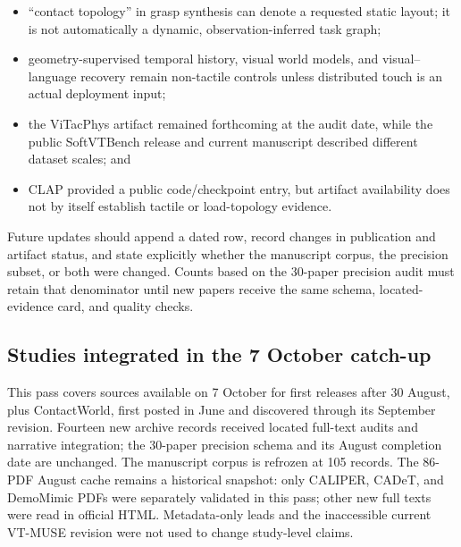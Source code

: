 \begin{itemize}
  \item ``contact topology'' in grasp synthesis can denote a requested static
  layout; it is not automatically a dynamic, observation-inferred task graph;
  \item geometry-supervised temporal history, visual world models, and visual--
  language recovery remain non-tactile controls unless distributed touch is an
  actual deployment input;
  \item the ViTacPhys artifact remained forthcoming at the audit date, while the
  public SoftVTBench release and current manuscript described different dataset
  scales; and
  \item CLAP provided a public code/checkpoint entry, but artifact availability
  does not by itself establish tactile or load-topology evidence.
\end{itemize}

Future updates should append a dated row, record changes in publication and
artifact status, and state explicitly whether the manuscript corpus, the
precision subset, or both were changed. Counts based on the 30-paper precision
audit must retain that denominator until new papers receive the same schema,
located-evidence card, and quality checks.

\subsection{Studies integrated in the 7 October catch-up}

This pass covers sources available on 7 October for first releases after
30 August, plus ContactWorld, first posted in June and discovered through its
September revision. Fourteen new archive records received located full-text
audits and narrative integration; the 30-paper precision schema and its August
completion date are unchanged. The manuscript corpus is refrozen at 105 records.
The 86-PDF August cache remains a historical snapshot: only CALIPER, CADeT, and
DemoMimic PDFs were separately validated in this pass; other new full texts were
read in official HTML. Metadata-only leads and the inaccessible current VT-MUSE
revision were not used to change study-level claims.

